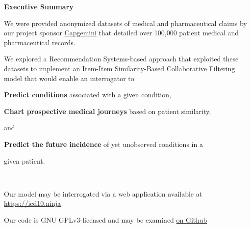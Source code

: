 \documentclass[twoside,11pt]{article}
\newcommand*\circled[1]{\tikz[baseline=(char.base)]{
            \node[shape=circle,draw,inner sep=1pt] (char) {#1};}}
\begin{document}
\newpage

\vspace*{\fill}

\begin{center}
	\textbf{\huge{Executive Summary}}
\end{center}

\begin{adjustwidth}{50pt}{50pt}
\Large{

We were provided anonymized datasets of medical and pharmaceutical claims by our project sponsor \href{https://www.capgemini.com/us-en/}{Capgemini} that detailed over 100,000 patient medical and pharmaceutical records.

We explored a Recommendation Systems-based approach that exploited these datasets to implement an Item-Item Similarity-Based Collaborative Filtering model that would enable an interrogator to

\vspace{1em}

\begin{adjustwidth}{-1.25em}{}
\circled{1} \textbf{Predict conditions} associated with a given condition,
\end{adjustwidth}

\begin{adjustwidth}{-1.25em}{}
\circled{2} \textbf{Chart prospective medical journeys} based on patient similarity,
\begin{adjustwidth}{1.4em}{}
and
\end{adjustwidth}
\end{adjustwidth}

\begin{adjustwidth}{-1.125em}{}
\circled{3} \textbf{Predict the future incidence} of yet unobserved conditions in a 
  \begin{adjustwidth}{1.4em}{}
  given patient.
  \end{adjustwidth}
\end{adjustwidth}

\

Our model may be interrogated via a web application available at \\
\href{https://icd10.ninja}{https://icd10.ninja}

Our code is GNU GPLv3-licensed and may be examined \href{https://github.com/afreeorange/ISYE6748}{on Github}
}

\end{adjustwidth}

\vspace*{\fill}
\end{document}
